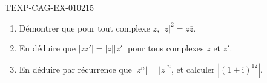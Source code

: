 \begin{exercice}{TEXP-CAG-EX-010}{2}{15}
\begin{enumerate}
  \item Démontrer que pour tout complexe $z$, $|z|^2=z\overline{z}$.
  \item En déduire que $|zz'|=|z||z'|$ pour tous complexes $z$ et $z'$.
  \item En déduire par récurrence que $|z^n|=|z|^n$, et calculer
        $\left|(1+\mathrm{i})^{12}\right|$.
\end{enumerate}
\end{exercice}
